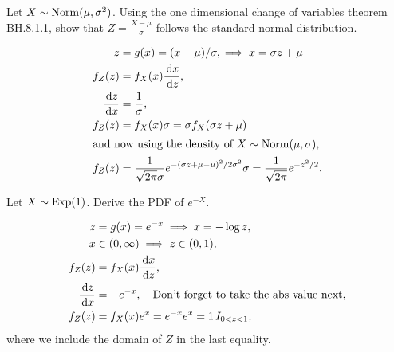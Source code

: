 \documentclass[assignments]{subfiles}
\begin{document}
\begin{exercise}
Let $X \sim \mathrm{Norm}(\mu,\sigma^2)$. Using the one dimensional change of variables theorem  BH.8.1.1, show that $Z = \frac{X-\mu}{\sigma}$ follows the standard normal distribution.
\begin{solution}
  \begin{align}
    \label{eq:18}
    z &= g(x) = (x-\mu)/\sigma, \implies x = \sigma z + \mu\\
f_{Z}(z) &= f_{X}(x) \frac{\,\textrm{d}x}{\,\textrm{d}z}, \\
\frac{\,\textrm{d}z}{\,\textrm{d}x } &= \frac{1}{\sigma}, \\
f_{Z}(z) &= f_{X}(x) \sigma = \sigma f_{X}(\sigma z + \mu) \\
\intertext{and now using the density of $X\sim \mathrm{Norm}(\mu, \sigma$),}
f_{Z}(z) &=\frac1{\sqrt{2\pi} \sigma } e^{-(\sigma z + \mu -\mu)^{2}/2\sigma^{2}} \sigma = \frac1{\sqrt{2\pi}} e^{-z^{2}/2}.
  \end{align}
\end{solution}
\end{exercise}

\begin{exercise}
Let $X \sim \mathrm{Exp}(1)$. Derive the PDF of $e^{-X}$.
\begin{solution}
  \begin{align}
z &= g(x) = e^{-x} \implies x = - \log z,\\
x &\in (0, \infty) \implies z \in (0, 1),\\
f_{Z}(z) &= f_{X}(x) \frac{\,\textrm{d}x}{\,\textrm{d}z}, \\
\frac{\,\textrm{d}z}{\,\textrm{d}x } &= - e^{-x}, \quad \text{Don't forget to take the abs value next}, \\
f_{Z}(z) &= f_{X}(x) e^{x} = e^{-x} e^{x} = 1 \,I_{0< z < 1},
  \end{align}
where we include the domain of $Z$ in the last equality.
\end{solution}
\end{exercise}
\end{document}
